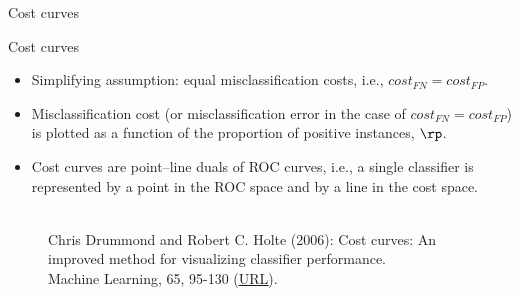 \documentclass[11pt,compress,t,notes=noshow, xcolor=table]{beamer}
\begin{document}
\begin{vbframe}{Cost curves}

\end{vbframe}


\begin{vbframe}{Cost curves}

\begin{footnotesize}

\begin{itemize}
  \item Simplifying assumption: equal misclassification costs, i.e., 
  $cost_{FN} = cost_{FP}$.
  \item Misclassification cost (or misclassification error in the case of 
  $cost_{FN} = cost_{FP}$) is plotted as a function of the proportion of 
  positive instances, $\rp$.
  \item Cost curves are point–line duals of ROC curves, i.e., a single 
  classifier is represented by a point in the ROC space and by a line in the 
  cost space.
\end{itemize}

\end{footnotesize}

\begin{figure}
  \centering
  \tiny
  \\Chris Drummond and Robert C. Holte (2006): Cost curves: An improved
  method for visualizing classifier performance. \\Machine Learning, 65, 95-130 
  (\href{https://www.semanticscholar.org/paper/Cost-curves\%3A-An-improved-method-for  -visualizing-Drummond-Holte/71708ce984e0896e7383435913547e770572410e}
  {\underline{URL}}).
\end{figure}


\end{vbframe}
\end{document}
